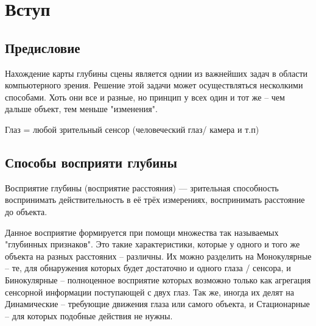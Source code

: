 \chapter*{Вступ}

\section{Предисловие}
	Нахождение карты глубины сцены является однии из важнейших задач в области компьютерного зрения. Решение этой задачи может осуществляться несколкими способами. Хоть они все и разные, но принцип у всех один и тот же -- чем дальше объект, тем меньше "изменения".   
	
Глаз = любой зрительный сенсор (человеческий глаз/ камера и т.п) 

\section{Способы восприяти глубины}
	Восприятие глубины (восприятие расстояния) — зрительная способность воспринимать действительность в её трёх измерениях, воспринимать расстояние до объекта.
	
	
	 Данное восприятие формируется при помощи множества так называемых "глубинных признаков". Это такие характеристики, которые у одного и того же объекта на разных расстояних -- различны.  Их можно разделить на Монокулярные -- те, для обнаружения которых будет достаточно и одного глаза / сенсора, и Бинокулярные -- полноценное восприятие которых возможно только как агрегация сенсорной информации поступающей с двух глаз. Так же, иногда их делят на Динамические -- требующие движения глаза или самого объекта, и Стационарные	-- для которых подобные действия не нужны. 
	
	\newpage
